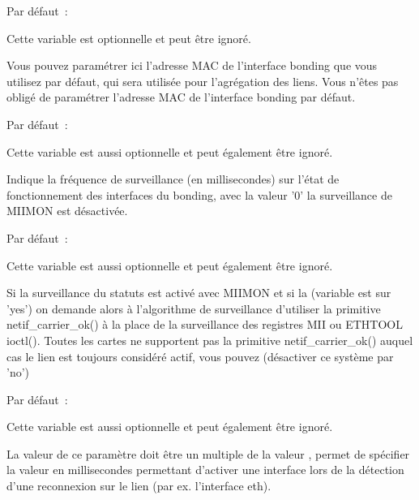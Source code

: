 \begin{description}

  Par défaut~: 

  Cette variable est optionnelle et peut être ignoré.

  Vous pouvez paramétrer ici l'adresse MAC de l'interface bonding que vous utilisez
  par défaut, qui sera utilisée pour l'agrégation des liens. Vous n'êtes pas obligé
  de paramétrer l'adresse MAC de l'interface bonding par défaut.


  Par défaut~: 

  Cette variable est aussi optionnelle et peut également être ignoré.

  Indique la fréquence de surveillance (en millisecondes) sur l'état de fonctionnement
  des interfaces du bonding, avec la valeur '0' la surveillance de MIIMON est désactivée.


  Par défaut~: 

  Cette variable est aussi optionnelle et peut également être ignoré.

  Si la surveillance du statuts est activé avec MIIMON et si la (variable est sur
  'yes') on demande alors à l'algorithme de surveillance d'utiliser la primitive
  netif\_carrier\_ok() à la place de la surveillance des registres MII ou ETHTOOL
  ioctl(). Toutes les cartes ne supportent pas la primitive netif\_carrier\_ok()
  auquel cas le lien est toujours considéré actif, vous pouvez (désactiver ce système
  par 'no')


  Par défaut~: 

  Cette variable est aussi optionnelle et peut également être ignoré.

  La valeur de ce paramètre doit être un multiple de la valeur
  , permet de spécifier la valeur en millisecondes
  permettant d'activer une interface lors de la détection d'une reconnexion sur
  le lien (par ex. l'interface eth).



\end{description}
